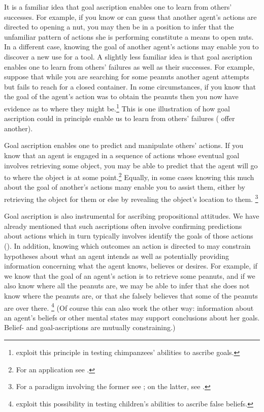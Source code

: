 \documentclass[14pt,a4paper]{extarticle}
\begin{document}
It is a familiar idea that goal ascription enables one to learn from others' successes.
For example,
if you know or can guess that another agent's actions are directed to opening a nut,
you may then be in a position to infer that the unfamiliar pattern of actions she is performing constitute a means to open nuts.
In a different case, knowing the goal of another agent's actions may enable you to discover a new use for a tool.
A slightly less familiar idea is that goal ascription enables one to learn from others' failures as well as their successes.
For example, suppose that while you are searching for some peanuts 
another agent attempts but fails to reach for a closed container.
In some circumstances,
if you know that the goal of the agent's action was to obtain the peanuts
then you now have evidence as to where they might be.\footnote{
\citet{hare_chimpanzees_2004} exploit this principle in testing chimpanzees' abilities to ascribe goals.
}
This is one illustration of how goal ascription could in principle enable us to learn from others' failures 
(\citealp{Want:2001hp} offer another).


Goal ascription enables one
to predict and manipulate others' actions.
If you know that an agent is engaged in a sequence of actions whose eventual goal involves retrieving some object,
you may be able to predict that the agent will go to where the object is at some point.\footnote{
For an application see \citet{Hare:2001ph}.
}
Equally, in some cases knowing this much about the goal of another's actions many enable you to assist them,
either 
by retrieving the object for them 
or else
by revealing the object's location to them.%
\footnote{
For a paradigm involving the former see \citet{warneken:2007sa};
on the latter, see \citet{Liszkowski:2008al}.
}

Goal ascription is also instrumental for ascribing propositional attitudes.
We have already mentioned that such ascriptions often involve 
confirming predictions about actions 
which in turn typically involves
identify the goals of those actions ().
In addition,
knowing which outcomes an action is directed to may constrain hypotheses about what an agent intends 
as well as
potentially providing information concerning what the agent knows, believes or desires.
For example,
if we know that the goal of an agent's action is to retrieve some peanuts,
and if we also know where all the peanuts are,
we may be able to infer that she does not know where the peanuts are,
or that she falsely believes that some of the peanuts are over there.%
\footnote{
\citet{Wimmer:1998kx} exploit this possibility in testing children's abilities to ascribe false beliefs.
}
(Of course this can also work the other way:
information about an agent's beliefs or other mental states may support conclusions about her goals.
Belief- and goal-ascriptions are mutually constraining.)
\end{document}
